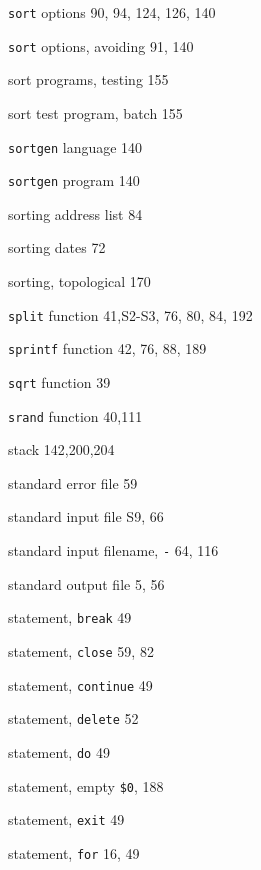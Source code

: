 \begin{multicols}{3}
\hangindent=3pc  \verb'sort' options 90, 94, 124, 126, 140

\hangindent=3pc  \verb'sort' options, avoiding 91, 140


\hangindent=3pc  sort programs, testing 155

\hangindent=3pc  sort test program, batch 155

\hangindent=3pc  \verb'sortgen' language 140

\hangindent=3pc  \verb'sortgen' program 140

\hangindent=3pc  sorting address list 84

\hangindent=3pc  sorting dates 72

\hangindent=3pc  sorting, topological 170

\hangindent=3pc  \verb'split' function 41,S2-S3, 76, 80, 84, 192

\hangindent=3pc  \verb'sprintf' function 42, 76, 88, 189

\hangindent=3pc  \verb'sqrt' function 39

\hangindent=3pc  \verb'srand' function 40,111

\hangindent=3pc  stack 142,200,204

\hangindent=3pc  standard error file 59

\hangindent=3pc  standard input file S9, 66

\hangindent=3pc  standard input filename, \verb'-' 64, 116

\hangindent=3pc  standard output file 5, 56

\hangindent=3pc  statement, \verb'break' 49

\hangindent=3pc  statement, \verb'close' 59, 82

\hangindent=3pc  statement, \verb'continue' 49

\hangindent=3pc  statement, \verb'delete' 52

\hangindent=3pc  statement, \verb'do' 49

\hangindent=3pc  statement, empty \verb'$0', 188

\hangindent=3pc  statement, \verb'exit' 49

\hangindent=3pc  statement, \verb'for' 16, 49


\end{multicols}
